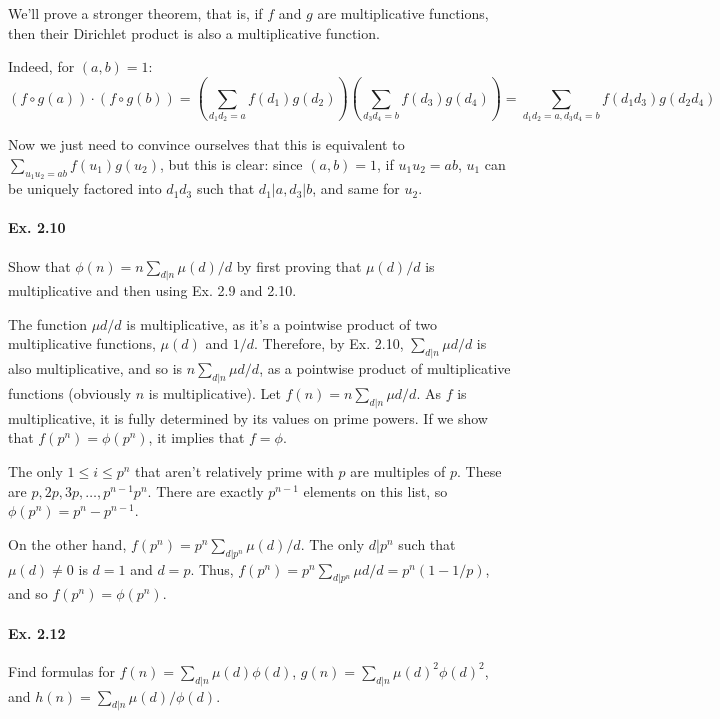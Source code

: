 \documentclass[notitlepage]{article}
\theoremstyle{definition}
\begin{document}
We'll prove a stronger theorem, that is, if $f$ and $g$ are
multiplicative functions, then their Dirichlet product is also a
multiplicative function. 

Indeed, for $(a, b) = 1$:
\begin{equation}
  (f \circ g(a)) \cdot (f \circ g(b)) = \left(\sum_{d_1 d_2 = a}
  f(d_1)g(d_2)\right)\left(\sum_{d_3 d_4 = b} f(d_3)g(d_4)\right) =
  \sum_{d_1 d_2 = a, d_3 d_4 = b} f(d_1 d_3) g(d_2 d_4)
\end{equation}

Now we just need to convince ourselves that this is equivalent to
$\sum_{u_1 u_2 = ab} f(u_1)g(u_2)$, but this is clear: since $(a, b) =
1$, if $u_1 u_2 = ab$, $u_1$ can be uniquely factored into $d_1 d_3$
such that $d_1 | a, d_3 | b$, and same for $u_2$.

\paragraph{Ex. 2.10}
Show that $\phi(n) = n \sum_{d|n}\mu(d)/d$ by first proving that
$\mu(d)/d$ is multiplicative and then using Ex. 2.9 and 2.10.

The function $\mu{d}/d$ is multiplicative, as it's a pointwise product
of two multiplicative functions, $\mu(d)$ and $1/d$. Therefore, by
Ex. 2.10, $\sum_{d|n}\mu{d}/d$ is also multiplicative, and so is
$n\sum_{d|n}\mu{d}/d$, as a pointwise product of multiplicative
functions (obviously $n$ is multiplicative).  Let $f(n) = n
\sum_{d|n}\mu{d}/d$. As $f$ is multiplicative, it is fully determined
by its values on prime powers. If we show that $f(p^n) = \phi(p^n)$,
it implies that $f = \phi$.

The only $1 \leq i \leq p^n$ that aren't relatively prime with $p$ are
multiples of $p$. These are $p, 2p, 3p, \ldots, p^{n-1} p^n$. There
are exactly $p^{n-1}$ elements on this list, so $\phi(p^n) = p^n -
p^{n-1}$.

On the other hand, $f(p^n) = p^n \sum_{d|p^n}\mu(d)/d$. The only
$d|p^n$ such that $\mu(d) \ne 0$ is $d = 1$ and $d = p$. Thus, $f(p^n)
= p^n \sum_{d|p^n}\mu{d}/d = p^n(1 - 1/p)$, and so $f(p^n) =
\phi(p^n)$.

\paragraph{Ex. 2.12}
Find formulas for $f(n) = \sum_{d|n} \mu(d)\phi(d)$, $g(n) = \sum_{d|n}
\mu(d)^2\phi(d)^2$, and $h(n) = \sum_{d|n} \mu(d)/\phi(d)$.
\end{document}
